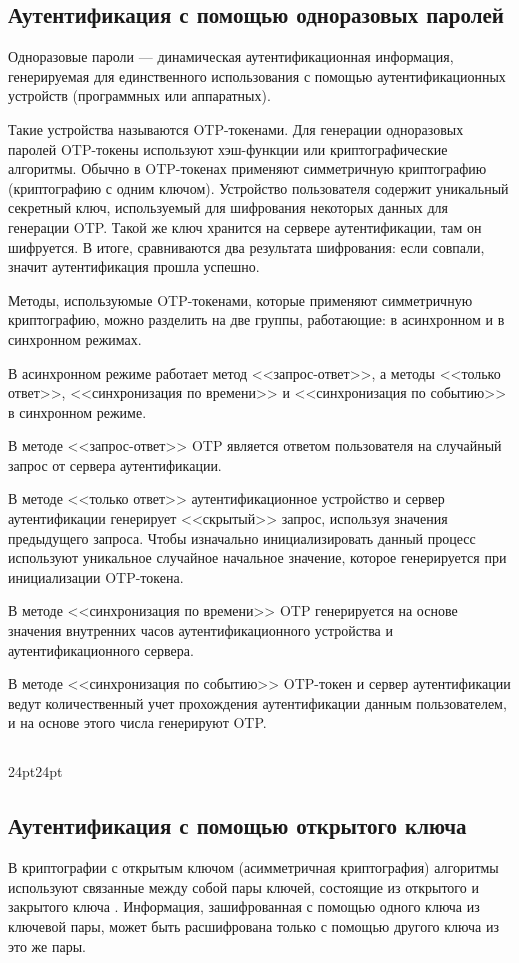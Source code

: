 \subsection{Аутентификация с помощью одноразовых паролей}
Одноразовые пароли \cite{bib2} --- динамическая аутентификационная информация, генерируемая для единственного использования с помощью аутентификационных устройств (программных или аппаратных).

Такие устройства называются OTP-токенами. Для генерации одноразовых паролей OTP-токены используют хэш-функции или криптографические алгоритмы. Обычно в OTP-токенах применяют симметричную криптографию \linebreak (криптографию с одним ключом). Устройство пользователя содержит уникальный секретный ключ, используемый для шифрования некоторых данных для генерации OTP. Такой же ключ хранится на сервере аутентификации, там он шифруется. В итоге, сравниваются два результата шифрования: если совпали, значит аутентификация прошла успешно.

Методы, используюмые OTP-токенами, которые применяют симметричную криптографию, можно разделить на две группы, работающие: в асинхронном и в синхронном режимах. 

В асинхронном режиме работает метод <<запрос-ответ>>, а методы <<только ответ>>, <<синхронизация по времени>> и <<синхронизация по событию>> в синхронном режиме.

В методе <<запрос-ответ>> OTP является ответом пользователя на случайный запрос от сервера аутентификации.

В методе <<только ответ>> аутентификационное устройство и сервер аутентификации генерирует <<скрытый>> запрос, используя значения предыдущего запроса. Чтобы изначально инициализировать данный процесс используют уникальное случайное начальное значение, которое генерируется при инициализации OTP-токена. 

В методе <<синхронизация по времени>> OTP генерируется на основе значения внутренних часов аутентификационного устройства и аутентификационного сервера. 

В методе <<синхронизация по событию>> OTP-токен и сервер аутентификации ведут количественный учет прохождения аутентификации данным пользователем, и на основе этого числа генерируют OTP.

\titlespacing\subsection{\parindent}{24pt}{24pt}
\subsection{Аутентификация с помощью открытого ключа}
В криптографии с открытым ключом (асимметричная криптография) алгоритмы используют связанные между собой пары ключей, состоящие из открытого и закрытого ключа \cite{bib2}. Информация, зашифрованная с помощью одного ключа из ключевой пары, может быть расшифрована только с помощью другого ключа из это же пары.

